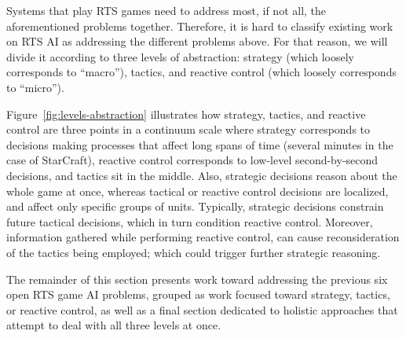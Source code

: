 \documentclass{llncs}
\begin{document}
Systems that  play RTS  games need  to address most,  if not  all, the
aforementioned problems  together. Therefore,  it is hard  to classify
existing  work  on  RTS  AI   as  addressing  the  different  problems
above. For that reason, %
we will divide  it according to three levels  of abstraction: strategy
(which loosely corresponds to ``macro''), tactics, and reactive control
(which loosely corresponds to ``micro'').

Figure~\ref{fig:levels-abstraction}   illustrates   how
strategy, tactics, and reactive control are three points in a continuum
scale where  strategy corresponds  to decisions making  processes that
affect long spans of time (several  minutes in the case of StarCraft),
reactive control corresponds  to low-level second-by-second decisions,
and tactics sit in the  middle. Also, strategic decisions reason about
the whole game at once, whereas tactical or reactive control decisions
are localized,  and affect only  specific groups of  units. Typically,
strategic decisions constrain future tactical decisions, which in turn
condition  reactive  control.  Moreover,  information  gathered  while
performing reactive control, can  cause reconsideration of the tactics
being employed; which could trigger further strategic reasoning.

The remainder of this section presents work toward addressing the previous six open RTS game AI problems, grouped as work focused toward strategy, tactics, or reactive control, as well as a final section dedicated to holistic approaches that attempt to deal with all three levels at once.

\end{document}
